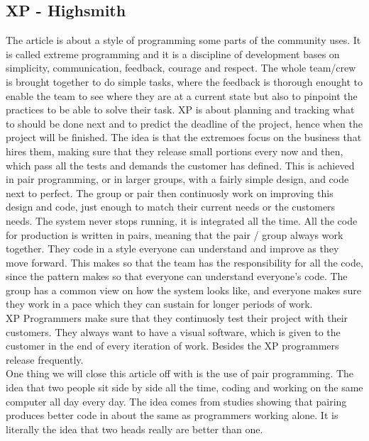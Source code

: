 \documentclass[12pt,a4paper]{article}
\begin{document}
\subsection{XP - Highsmith}
The article is about a style of programming some parts of the community uses. It is called extreme programming and it is a discipline of development bases on simplicity, communication, feedback, courage and respect. The whole team/crew is brought together to do simple tasks, where the feedback is thorough enought to enable the team to see where they are at a current state but also to pinpoint the practices to be able to solve their task. XP is about planning and tracking what to should be done next and to predict the deadline of the project, hence when the project will be finished. The idea is that the extremoes focus on the business that hires them, making sure that they release small portions every now and then, which pass all the tests and demands the customer has defined. This is achieved in pair programming, or in larger groups, with a fairly simple design, and code next to perfect. The group or pair then continuosly work on improving this design and code, just enough to match their current needs or the customers needs. The system never stops running, it is integrated all the time. All the code for production is written in pairs, meaning that the pair / group always work together. They code in a style everyone can understand and improve as they move forward. This makes so that the team has the responsibility for all the code, since the pattern makes so that everyone can understand everyone's code. The group has a common view on how the system looks like, and everyone makes sure they work in a pace which they can sustain for longer periods of work. \\
XP Programmers make sure that they continuosly test their project with their customers. They always want to have a visual software, which is given to the customer in the end of every iteration of work. Besides the XP programmers release frequently. \\
One thing we will close this article off with is the use of pair programming. The idea that two people sit side by side all the time, coding and working on the same computer all day every day. The idea comes from studies showing that pairing produces better code in about the same as programmers working alone. It is literally the idea that two heads really are better than one.\\
\\
\end{document}
